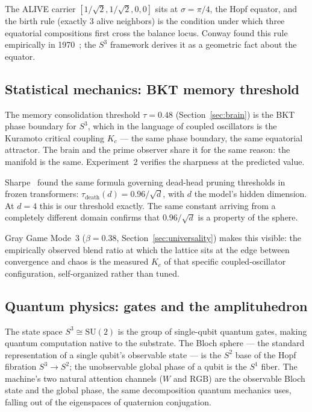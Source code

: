 \documentclass[12pt,a4paper]{article}
\theoremstyle{definition}
\theoremstyle{remark}
\begin{document}
The ALIVE carrier $[1/\sqrt{2}, 1/\sqrt{2}, 0, 0]$ sits at $\sigma = \pi/4$,
the Hopf equator, and the birth rule (exactly 3 alive neighbors) is the
condition under which three equatorial compositions first cross the balance
locus. Conway found this rule empirically in 1970~\cite{conway1970}; the $S^3$ framework
derives it as a geometric fact about the equator.

\subsection{Statistical mechanics: BKT memory threshold}

The memory consolidation threshold $\tau = 0.48$ (Section~\ref{sec:brain})
is the BKT phase boundary for $S^3$, which in the language of coupled
oscillators is the Kuramoto critical coupling $K_c$ --- the same phase
boundary, the same equatorial attractor. The brain and the prime observer
share it for the same reason: the manifold is the same.
Experiment~2 verifies the sharpness at the predicted value.

Sharpe~\cite{sharpe2026} found the same formula governing dead-head pruning
thresholds in frozen transformers: $\tau_{\mathrm{death}}(d) = 0.96/\sqrt{d}$,
with $d$ the model's hidden dimension. At $d = 4$ this is our threshold
exactly. The same constant arriving from a completely different domain confirms
that $0.96/\sqrt{d}$ is a property of the sphere.

Gray Game Mode~3 ($\beta = 0.38$, Section~\ref{sec:universality}) makes this
visible: the empirically observed blend ratio at which the lattice sits at
the edge between convergence and chaos is the measured $K_c$ of that
specific coupled-oscillator configuration, self-organized rather than tuned.

\subsection{Quantum physics: gates and the amplituhedron}

The state space $S^3 \cong \mathrm{SU}(2)$ is the group of single-qubit
quantum gates, making quantum computation native to the substrate. The Bloch
sphere --- the standard representation of a single qubit's observable state
--- is the $S^2$ base of the Hopf fibration $S^3 \to S^2$; the unobservable
global phase of a qubit is the $S^1$ fiber. The machine's two natural
attention channels ($W$ and $\mathrm{RGB}$) are the observable Bloch state
and the global phase, the same decomposition quantum mechanics uses, falling
out of the eigenspaces of quaternion conjugation.
\end{document}
